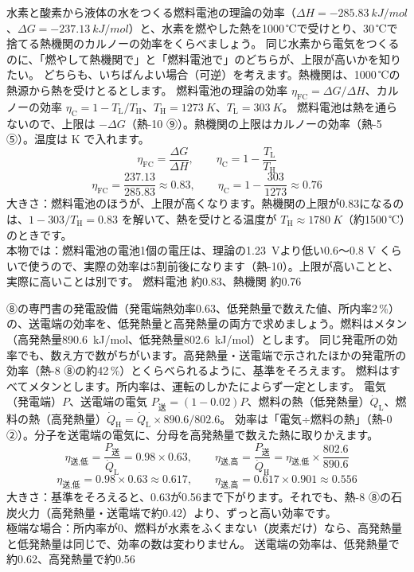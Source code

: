 \begin{phreidai}[燃料電池と熱機関の上限をくらべる]\label{ph:熱-16:ex4}
水素と酸素から液体の水をつくる燃料電池の理論の効率（$\Delta H=\qty{-285.83}{kJ/mol}$、$\Delta G=\qty{-237.13}{kJ/mol}$）と、水素を燃やした熱を1000\,℃で受けとり、30\,℃で捨てる熱機関のカルノーの効率をくらべましょう。
\phbamen
同じ水素から電気をつくるのに、「燃やして熱機関で」と「燃料電池で」のどちらが、上限が高いかを知りたい。
\phmushi
どちらも、いちばんよい場合（可逆）を考えます。熱機関は、1000\,℃の熱源から熱を受けとるとします。
\phzu
燃料電池の理論の効率 $\eta_{\mathrm{FC}}=\Delta G/\Delta H$、カルノーの効率 $\eta_{\mathrm C}=1-T_{\mathrm L}/T_{\mathrm H}$、$T_{\mathrm H}=\qty{1273}{K}$、$T_{\mathrm L}=\qty{303}{K}$。
\phriyu
燃料電池は熱を通らないので、上限は $-\Delta G$（熱-10 ⑨）。熱機関の上限はカルノーの効率（熱-5 ⑤）。温度は K で入れます。
\phtateru
\[\eta_{\mathrm{FC}}=\frac{\Delta G}{\Delta H},\qquad \eta_{\mathrm C}=1-\frac{T_{\mathrm L}}{T_{\mathrm H}}\]
\phtoku
\[\eta_{\mathrm{FC}}=\frac{237.13}{285.83}\approx0.83,\qquad \eta_{\mathrm C}=1-\frac{303}{1273}\approx0.76\]
\phtashikame
大きさ：燃料電池のほうが、上限が高くなります。熱機関の上限が0.83になるのは、$1-303/T_{\mathrm H}=0.83$ を解いて、熱を受けとる温度が $T_{\mathrm H}\approx\qty{1780}{K}$（約1500\,℃）のときです。\\
本物では：燃料電池の電池1個の電圧は、理論の\qty{1.23}{V}より低い0.6〜0.8 V くらいで使うので、実際の効率は5割前後になります（熱-10）。上限が高いことと、実際に高いことは別です。
\kotae 燃料電池 約0.83、熱機関 約0.76
\end{phreidai}

\begin{phreidai}\label{ph:熱-16:ex5}
⑧の専門書の発電設備（発電端熱効率0.63、低発熱量で数えた値、所内率2\,\%）の、送電端の効率を、低発熱量と高発熱量の両方で求めましょう。燃料はメタン（高発熱量\qty{890.6}{kJ/mol}、低発熱量\qty{802.6}{kJ/mol}）とします。
\phbamen
同じ発電所の効率でも、数え方で数がちがいます。高発熱量・送電端で示されたほかの発電所の効率（熱-8 ⑧の約42\,\%）とくらべられるように、基準をそろえます。
\phmushi
燃料はすべてメタンとします。所内率は、運転のしかたによらず一定とします。
\phzu
電気（発電端）$P$、送電端の電気 $P_{\text{送}}=(1-0.02)P$、燃料の熱（低発熱量）$\dot Q_{\mathrm L}$、燃料の熱（高発熱量）$\dot Q_{\mathrm H}=\dot Q_{\mathrm L}\times890.6/802.6$。
\phriyu
効率は「電気÷燃料の熱」（熱-0 ②）。分子を送電端の電気に、分母を高発熱量で数えた熱に取りかえます。
\phtateru
\[\eta_{\text{送,低}}=\frac{P_{\text{送}}}{\dot Q_{\mathrm L}}=0.98\times0.63,\qquad \eta_{\text{送,高}}=\frac{P_{\text{送}}}{\dot Q_{\mathrm H}}=\eta_{\text{送,低}}\times\frac{802.6}{890.6}\]
\phtoku
\[\eta_{\text{送,低}}=0.98\times0.63\approx0.617,\qquad \eta_{\text{送,高}}=0.617\times0.901\approx0.556\]
\phtashikame
大きさ：基準をそろえると、0.63が0.56まで下がります。それでも、熱-8 ⑧の石炭火力（高発熱量・送電端で約0.42）より、ずっと高い効率です。\\
極端な場合：所内率が0、燃料が水素をふくまない（炭素だけ）なら、高発熱量と低発熱量は同じで、効率の数は変わりません。
\kotae 送電端の効率は、低発熱量で約0.62、高発熱量で約0.56
\end{phreidai}

